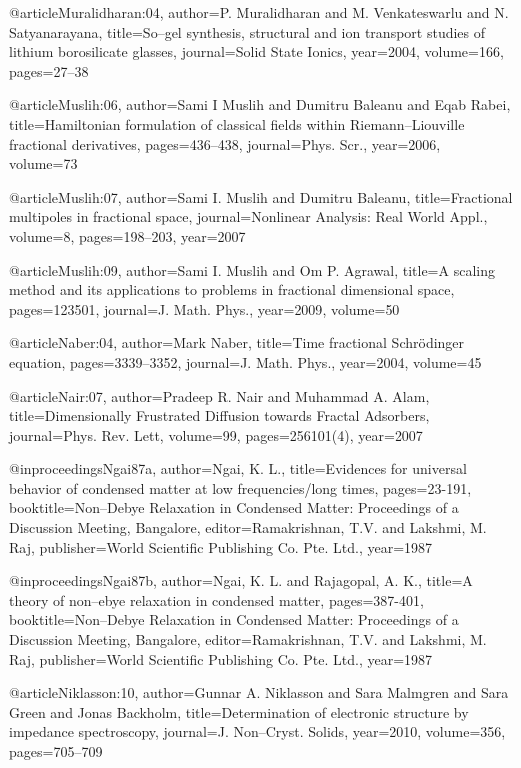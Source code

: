 \begin{thebibliography}{99}
@article{Muralidharan:04,
  author={P. Muralidharan and M. Venkateswarlu and N. Satyanarayana},
  title={So--gel synthesis, structural and ion transport studies of lithium borosilicate
    glasses},
  journal={Solid State Ionics},
  year={2004},
  volume={166},
  pages={27--38}
}

@article{Muslih:06,
  author={Sami I Muslih and Dumitru Baleanu and Eqab Rabei},
  title={Hamiltonian formulation of classical fields within {R}iemann--{L}iouville
    fractional derivatives},
  pages={436--438},
  journal={Phys. Scr.},
  year={2006},
  volume={73}
}

@article{Muslih:07,
  author={Sami I. Muslih and Dumitru Baleanu},
  title={Fractional multipoles in fractional space},
  journal={Nonlinear Analysis: Real World Appl.},
  volume={8},
  pages={198--203},
  year={2007}
}

@article{Muslih:09,
  author={Sami I. Muslih and Om P. Agrawal},
  title={A scaling method and its applications to problems in fractional dimensional
    space},
  pages={123501},
  journal={J. Math. Phys.},
  year={2009},
  volume={50}
}

@article{Naber:04,
  author={Mark Naber},
  title={Time fractional {S}chr\"{o}dinger equation},
  pages={3339--3352},
  journal={J. Math. Phys.},
  year={2004},
  volume={45}
}

@article{Nair:07,
  author={Pradeep R. Nair and Muhammad A. Alam},
  title={Dimensionally Frustrated Diffusion towards Fractal Adsorbers},
  journal={Phys. Rev. Lett},
  volume={99},
  pages={256101(4)},
  year={2007}
}

@inproceedings{Ngai87a,
  author={Ngai, K. L.},
  title={Evidences for universal behavior of condensed matter at low frequencies/long
    times},
  pages={23-191},
  booktitle={Non--Debye Relaxation in Condensed Matter: Proceedings of a Discussion
    Meeting, Bangalore},
  editor={Ramakrishnan, T.V. and Lakshmi, M. Raj},
  publisher={World Scientific Publishing Co. Pte. Ltd.},
  year={1987}
}

@inproceedings{Ngai87b,
  author={Ngai, K. L. and Rajagopal, A. K.},
  title={A theory of non--ebye relaxation in condensed matter},
  pages={387-401},
  booktitle={Non--Debye Relaxation in Condensed Matter: Proceedings of a Discussion
    Meeting, Bangalore},
  editor={Ramakrishnan, T.V. and Lakshmi, M. Raj},
  publisher={World Scientific Publishing Co. Pte. Ltd.},
  year={1987}
}

@article{Niklasson:10,
  author={Gunnar A. Niklasson and Sara Malmgren and Sara Green and Jonas Backholm},
  title={Determination of electronic structure by impedance spectroscopy},
  journal={J. Non--Cryst. Solids},
  year={2010},
  volume={356},
  pages={705--709}
}


\end{thebibliography}
